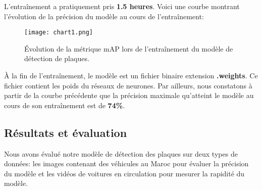     L’entraînement a pratiquement pris \textbf{1.5 heures}. Voici une courbe montrant l’évolution de la précision du modèle au cours de l’entraînement:
    \begin{figure}[H]
        \centering
        \texttt{[image: chart1.png]}
        \caption{Évolution de la métrique mAP lors de l'entraînement du modèle de détection de plaques.}
    \end{figure}
    À la fin de l'entraînement, le modèle est un fichier binaire extension \textbf{.weights}. Ce fichier contient les poids du réseaux de neurones. Par ailleurs, nous constatons à partir de la courbe précédente que la précision maximale qu'atteint le modèle au cours de son entraînement est de \textbf{74\%}.
    \subsection{Résultats et évaluation}
    Nous avons évalué notre modèle de détection des plaques sur deux types de données: les images contenant des véhicules au Maroc pour évaluer la précision du modèle et les vidéos de voitures en circulation pour mesurer la rapidité du modèle. 
    
